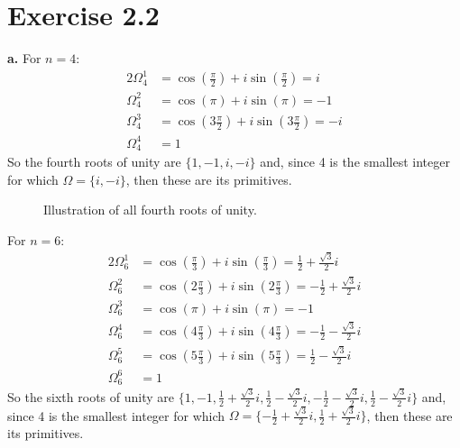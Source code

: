 \documentclass[12pt]{article}
\begin{document}
	\section*{Exercise 2.2}
	\textbf{a.}
	For $n = 4$:
	\begin{alignat*}{2}
	\Omega^1_4 &= \cos(\frac{\pi}{2}) + i \sin (\frac{\pi}{2}) = i\\
	\Omega^2_4 &= \cos(\pi) + i \sin (\pi) = -1\\
	\Omega^3_4 &= \cos(3\frac{\pi}{2}) + i \sin (3\frac{\pi}{2}) = -i\\
	\Omega^4_4 &= 1
	\end{alignat*}
	So the fourth roots of unity are $\{1, -1, i, -i\}$ and, since 4 is the smallest integer for which $\Omega = \{i, -i\}$, then these are its primitives.
	\begin{figure}[H]
	\def\n{4}
	\centering
	\caption{Illustration of all fourth roots of unity.}
	\end{figure}
	For $n = 6$:
	\begin{alignat*}{2}
	\Omega^1_6 &= \cos(\frac{\pi}{3}) + i \sin (\frac{\pi}{3}) = \frac{1}{2} + \frac{\sqrt{3}}{2}i\\
	\Omega^2_6 &= \cos(2\frac{\pi}{3}) + i \sin (2\frac{\pi}{3}) = - \frac{1}{2} + \frac{\sqrt{3}}{2}i\\
	\Omega^3_6 &= \cos(\pi) + i \sin (\pi) = -1\\
	\Omega^4_6 &= \cos(4\frac{\pi}{3}) + i \sin (4\frac{\pi}{3}) = - \frac{1}{2} - \frac{\sqrt{3}}{2}i\\
	\Omega^5_6 &= \cos(5\frac{\pi}{3}) + i \sin (5\frac{\pi}{3}) = \frac{1}{2} - \frac{\sqrt{3}}{2}i\\
	\Omega^6_6 &= 1
	\end{alignat*}
	So the sixth roots of unity are $\{1, -1, \frac{1}{2} + \frac{\sqrt{3}}{2}i, \frac{1}{2} - \frac{\sqrt{3}}{2}i, -\frac{1}{2} - \frac{\sqrt{3}}{2}i, \frac{1}{2} - \frac{\sqrt{3}}{2}i\}$ and, since 4 is the smallest integer for which $\Omega = \{- \frac{1}{2} + \frac{\sqrt{3}}{2}i, \frac{1}{2} + \frac{\sqrt{3}}{2}i\}$, then these are its primitives.\\
\end{document}
